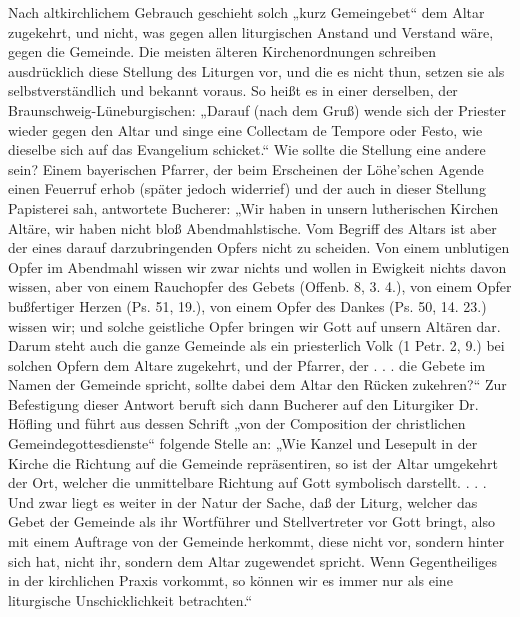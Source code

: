 Nach altkirchlichem Gebrauch geschieht solch „kurz Gemeingebet“ dem Altar zugekehrt, und nicht, was gegen allen liturgischen Anstand und Verstand wäre, gegen die Gemeinde. Die meisten älteren Kirchenordnungen schreiben ausdrücklich diese Stellung des Liturgen vor, und die es nicht thun, setzen sie als selbstverständlich und bekannt voraus. So heißt es in einer derselben, der Braunschweig-Lüneburgischen: „Darauf (nach dem Gruß) wende
sich der Priester wieder gegen den Altar und singe eine Collectam de Tempore oder Festo, wie dieselbe sich auf das Evangelium schicket.“ Wie sollte die Stellung eine andere sein? Einem bayerischen Pfarrer, der beim Erscheinen der Löhe’schen Agende einen Feuerruf erhob (später jedoch widerrief) und der auch in dieser Stellung Papisterei sah, antwortete Bucherer: „Wir haben in unsern lutherischen Kirchen Altäre, wir haben nicht bloß Abendmahlstische. Vom Begriff des Altars ist aber der eines darauf darzubringenden Opfers nicht zu scheiden. Von einem unblutigen Opfer im Abendmahl wissen wir zwar nichts und wollen in Ewigkeit nichts davon wissen, aber von einem Rauchopfer des Gebets (Offenb. 8, 3. 4.), von einem Opfer bußfertiger Herzen (Ps. 51, 19.), von einem Opfer des Dankes (Ps. 50, 14. 23.) wissen wir; und solche geistliche Opfer bringen wir Gott auf unsern Altären dar. Darum steht auch die ganze Gemeinde als ein priesterlich Volk (1 Petr. 2, 9.) bei solchen Opfern dem Altare zugekehrt, und der Pfarrer, der . . . die Gebete im Namen der Gemeinde spricht, sollte dabei dem Altar den Rücken zukehren?“ Zur Befestigung dieser Antwort beruft sich dann Bucherer auf den Liturgiker Dr. Höfling und führt aus dessen Schrift „von der Composition der christlichen Gemeindegottesdienste“ folgende Stelle an: „Wie Kanzel und Lesepult in der Kirche die Richtung auf die Gemeinde repräsentiren, so ist der Altar umgekehrt der Ort, welcher die unmittelbare Richtung auf Gott symbolisch darstellt. . . . Und zwar liegt es weiter in der Natur der Sache, daß der Liturg, welcher das Gebet der Gemeinde als ihr Wortführer und Stellvertreter vor Gott bringt, also mit einem Auftrage von der Gemeinde herkommt, diese nicht vor, sondern hinter sich hat, nicht ihr, sondern dem Altar zugewendet spricht. Wenn Gegentheiliges in der kirchlichen Praxis vorkommt, so können wir es immer nur als eine liturgische Unschicklichkeit betrachten.“

